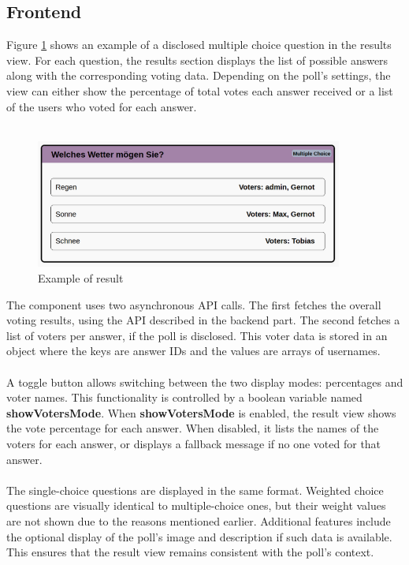 \documentclass[a4paper,12pt]{report}
\begin{document}
\subsection{Frontend}
Figure \ref{fig:result} shows an example of a disclosed multiple choice question in the results view. For each question, the results section displays the list of possible answers along with the corresponding voting data. Depending on the poll's settings, the view can either show the percentage of total votes each answer received or a list of the users who voted for each answer.\\ \\
\begin{figure}[H] 
	\centering 
	\includegraphics[width=0.9\textwidth]{pics/Results_example.png} 
	\caption{Example of result} 
	\label{fig:result} 
\end{figure}
The component uses two asynchronous API calls. The first fetches the overall voting results, using the API described in the backend part. The second fetches a list of voters per answer, if the poll is disclosed. This voter data is stored in an object where the keys are answer IDs and the values are arrays of usernames. \\ \\
A toggle button allows switching between the two display modes: percentages and voter names. This functionality is controlled by a boolean variable named \textbf{showVotersMode}. When \textbf{showVotersMode} is enabled, the result view shows the vote percentage for each answer. When disabled, it lists the names of the voters for each answer, or displays a fallback message if no one voted for that answer. \\ \\
The single-choice questions are displayed in the same format. Weighted choice questions are visually identical to multiple-choice ones, but their weight values are not shown due to the reasons mentioned earlier. Additional features include the optional display of the poll's image and description if such data is available. This ensures that the result view remains consistent with the poll's context.
\end{document}
